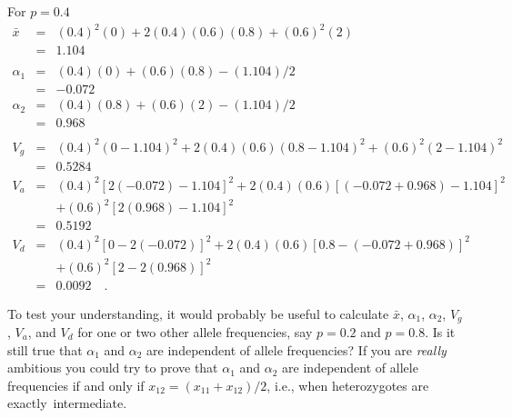 \documentclass[12pt]{article}
\begin{document}
For $p = 0.4$
\begin{eqnarray*}
{\bar x} &=& (0.4)^2(0) + 2(0.4)(0.6)(0.8) + (0.6)^2(2) \\
                    &=& 1.104 \\
\\
\alpha_1 &=& (0.4)(0) + (0.6)(0.8) - (1.104)/2 \\
         &=& -0.072 \\
\alpha_2 &=& (0.4)(0.8) + (0.6)(2) - (1.104)/2 \\
         &=& 0.968 \\
\\
V_g &=& (0.4)^2(0-1.104)^2 + 2(0.4)(0.6)(0.8-1.104)^2 + (0.6)^2(2-1.104)^2 \\
    &=& 0.5284 \\
V_a &=& (0.4)^2[2(-0.072)-1.104]^2 + 2(0.4)(0.6)[(-0.072+0.968)-1.104]^2 \\
       &&+ (0.6)^2[2(0.968)-1.104]^2 \\
    &=& 0.5192 \\
V_d &=& (0.4)^2[0 - 2(-0.072)]^2 + 2(0.4)(0.6)[0.8 - (-0.072+0.968)]^2 \\
       &&+ (0.6)^2[2 - 2(0.968)]^2 \\
    &=& 0.0092 \quad . 
\end{eqnarray*}

To test your understanding, it would probably be useful to calculate
${\bar x}$, $\alpha_1$, $\alpha_2$, $V_g$, $V_a$, and $V_d$ for one or
two other allele frequencies, say $p=0.2$ and $p=0.8$.  Is it still
true that $\alpha_1$ and $\alpha_2$ are independent of allele
frequencies?  If you are {\it really\/} ambitious you could try to
prove that $\alpha_1$ and $\alpha_2$ are independent of allele
frequencies if and only if $x_{12} = (x_{11}+x_{12})/2$, i.e., when
heterozygotes are exactly~intermediate.




\ccLicense
\end{document}
